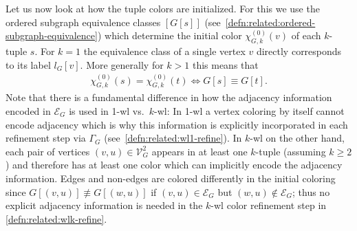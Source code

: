 Let us now look at how the tuple colors are initialized.
For this we use the ordered subgraph equivalence classes $[G[s]]$ (see~\cref{defn:related:ordered-subgraph-equivalence}) which determine the initial color $\chi_{G,k}^{(0)}(v)$ of each $k$-tuple $s$.
For $k = 1$ the equivalence class of a single vertex $v$ directly corresponds to its label $l_G[v]$.
More generally for $k > 1$ this means that
\begin{align}
	\chi_{G,k}^{(0)}(s) = \chi_{G,k}^{(0)}(t) \iff G[s] \equiv G[t] \text{.} \label{eq:related:wlk-init}
\end{align}
Note that there is a fundamental difference in how the adjacency information encoded in $\mathcal{E}_G$ is used in 1-\acs{wl} vs.\ $k$-\acs{wl}:
In 1-\acs{wl} a vertex coloring by itself cannot encode adjacency which is why this information is explicitly incorporated in each refinement step via $\Gamma_G$ (see~\cref{defn:related:wl1-refine}).
In $k$-\acs{wl} on the other hand, each pair of vertices $(v, u) \in \mathcal{V}_G^2$ appears in at least one $k$-tuple (assuming $k \geq 2$) and therefore has at least one color which can implicitly encode the adjacency information.
Edges and non-edges are colored differently in the initial coloring since $G[(v, u)] \not\equiv G[(w, u)]$ if $(v, u) \in \mathcal{E}_G$ but $(w, u) \notin \mathcal{E}_G$;
thus no explicit adjacency information is needed in the $k$-\acs{wl} color refinement step in \cref{defn:related:wlk-refine}.

